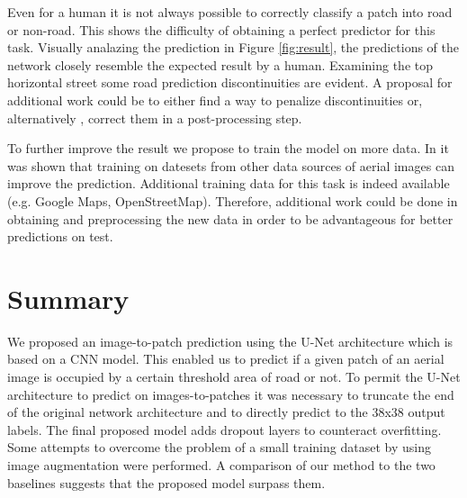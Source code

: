 \documentclass[10pt,conference,compsocconf]{IEEEtran}
\begin{document}
Even for a human it is not always possible to correctly classify a patch into road or non-road. This shows the difficulty of obtaining a perfect predictor for this task. Visually analazing the prediction in Figure \ref{fig:result}, the predictions of the network closely resemble the expected result by a human. Examining the top horizontal street some road prediction discontinuities are evident. A proposal for additional work could be to either find a way to penalize discontinuities or, alternatively , correct them in a post-processing step.

To further improve the result we propose to train the model on more data. In \cite{Kaiser2017} it was shown that training on datesets from other data sources of aerial images can improve the prediction. Additional training data for this task is indeed available (e.g. Google Maps, OpenStreetMap). Therefore, additional work could be done in obtaining and preprocessing the new data in order to be advantageous for better predictions on test.

\section{Summary}

We proposed an image-to-patch prediction using the U-Net architecture which is based on a CNN model. This enabled us to predict if a given patch of an aerial image is occupied by a certain threshold area of road or not. To permit the U-Net architecture to predict on images-to-patches it was necessary to truncate the end of the original network architecture and to directly predict to the 38x38 output labels. The final proposed model adds dropout layers to counteract overfitting. Some attempts to overcome the problem of a small training dataset by using image augmentation were performed. A comparison of our method to the two baselines suggests that the proposed model surpass them.






\end{document}
